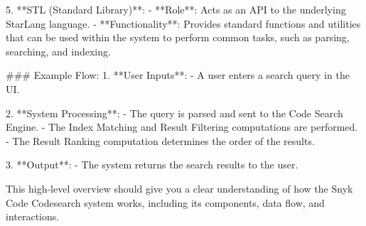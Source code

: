 5. **STL (Standard Library)**:
   - **Role**: Acts as an API to the underlying StarLang language.
   - **Functionality**: Provides standard functions and utilities that can be used within the system to perform common tasks, such as parsing, searching, and indexing.

### Example Flow:
1. **User Inputs**:
   - A user enters a search query in the UI.
   
2. **System Processing**:
   - The query is parsed and sent to the Code Search Engine.
   - The Index Matching and Result Filtering computations are performed.
   - The Result Ranking computation determines the order of the results.
   
3. **Output**:
   - The system returns the search results to the user.

This high-level overview should give you a clear understanding of how the Snyk Code Codesearch system works, including its components, data flow, and interactions.